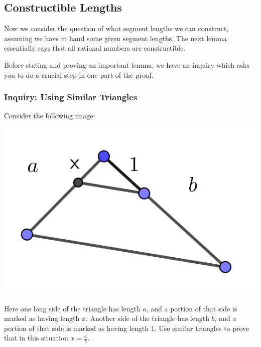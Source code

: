 \documentclass[11pt]{article}
\newenvironment{task}
	{\begin{mdframed}[linecolor=lightgray, linewidth=3pt]\raggedright}
	{\end{mdframed}}
\theoremstyle{definition}
\begin{document}
\subsection{Constructible Lengths}

Now we consider the question of what segment lengths we can construct, assuming we have in hand some given segment lengths. The next lemma essentially
says that all rational numbers are constructible.

Before stating and proving an important lemma, we have an inquiry which asks you to do a crucial step in one part of the proof.

\subsubsection{Inquiry: Using Similar Triangles}
\begin{task}
  Consider the following image:
  \begin{center}
    \includegraphics[scale=.1]{Images/a_over_b.png}
  \end{center}
  Here one long side of the triangle has length $a$, and a portion of that side is marked as having length $x$. Another side of the
  triangle has length $b$, and a portion of that side is marked as having length $1$. Use similar triangles to prove that in this situation $x = \frac{a}{b}$.
\end{task}
\end{document}
